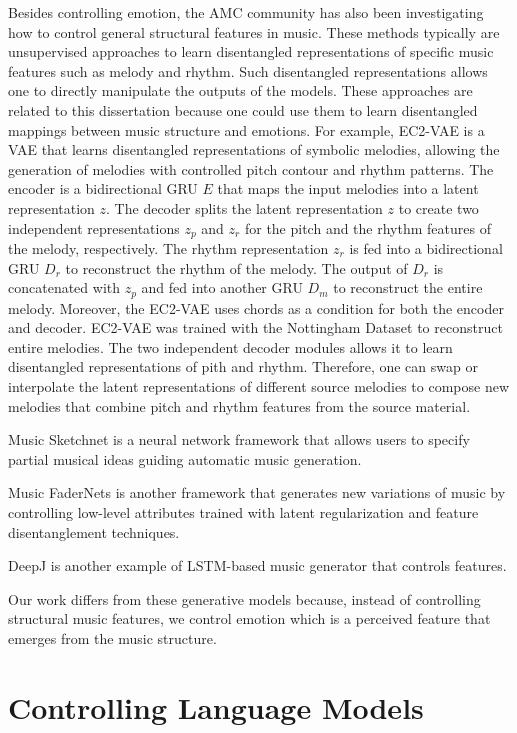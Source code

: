 Besides controlling emotion, the AMC community has also been investigating how to control general structural features in music. These methods typically are unsupervised approaches to learn disentangled representations of specific music features such as melody and rhythm. Such disentangled representations allows one to directly manipulate the outputs of the models. These approaches are related to this dissertation because one could use them to learn disentangled mappings between music structure and emotions. For example, EC2-VAE \cite{yang2019deep} is a VAE that learns disentangled representations of symbolic melodies, allowing the generation of melodies with controlled pitch contour and rhythm patterns. The encoder is a bidirectional GRU $E$ that maps the input melodies into a latent representation $z$. The decoder splits the latent representation $z$ to create two independent representations $z_p$ and $z_r$ for the pitch and the rhythm features of the melody, respectively. The rhythm representation $z_r$ is fed into a bidirectional GRU $D_r$ to reconstruct the rhythm of the melody. The output of $D_r$ is concatenated with $z_p$ and fed into another GRU $D_m$ to reconstruct the entire melody. Moreover, the EC2-VAE uses chords as a condition for both the encoder and decoder. EC2-VAE was trained with the Nottingham Dataset \cite{} to reconstruct entire melodies. The two independent decoder modules allows it to learn disentangled representations of pith and rhythm. Therefore, one can swap or interpolate the latent representations of different source melodies to compose new melodies that combine pitch and rhythm features from the source material.

Music Sketchnet \cite{chen2020music} is a neural network framework that allows users to specify partial musical ideas guiding automatic music generation.

Music FaderNets \cite{tan2020music} is another framework that generates new variations of music by controlling low-level attributes trained with latent regularization and feature disentanglement techniques.

DeepJ \cite{} is another example of LSTM-based music generator that controls features.

Our work differs from these generative models because, instead of controlling structural music features, we control emotion which is a perceived feature that emerges from the music structure.

\section{Controlling Language Models}

